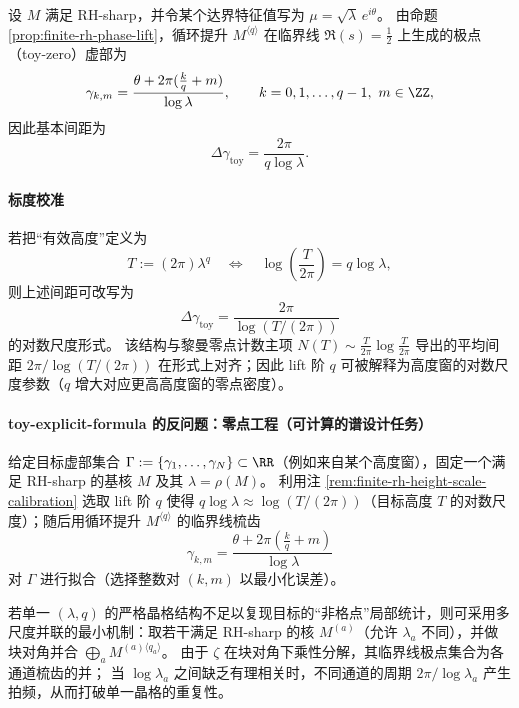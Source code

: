 \begin{remark}[高度--尺度校准：用 \texorpdfstring{$T=(2\pi)\lambda^q$}{T=(2pi)lambda^q} 对齐临界线梳齿密度]\label{rem:finite-rh-height-scale-calibration}
设 \(M\) 满足 RH-sharp，并令某个达界特征值写为 \(\mu=\sqrt{\lambda}\,e^{i\theta}\)。
由命题 \ref{prop:finite-rh-phase-lift}，循环提升 \(M^{\langle q\rangle}\) 在临界线 \(\Re(s)=\tfrac12\) 上生成的极点（toy-zero）虚部为
\[
\gamma_{k,m}=\frac{\theta+2\pi(\frac{k}{q}+m)}{\log\lambda},
\qquad k=0,1,\dots,q-1,\ m\in\ZZ,
\]
因此基本间距为
\[
\Delta\gamma_{\mathrm{toy}}=\frac{2\pi}{q\log\lambda}.
\]
\paragraph{标度校准}
若把“有效高度”定义为
\[
T:=(2\pi)\lambda^q
\quad\Longleftrightarrow\quad
\log\!\left(\frac{T}{2\pi}\right)=q\log\lambda,
\]
则上述间距可改写为
\[
\boxed{\ \Delta\gamma_{\mathrm{toy}}=\frac{2\pi}{\log(T/(2\pi))}\ }
\]
的对数尺度形式。
该结构与黎曼零点计数主项 \(N(T)\sim \frac{T}{2\pi}\log\frac{T}{2\pi}\) 导出的平均间距 \(2\pi/\log(T/(2\pi))\) 在形式上对齐；因此 lift 阶 \(q\) 可被解释为高度窗的对数尺度参数（\(q\) 增大对应更高高度窗的零点密度）。
\end{remark}

\paragraph{toy-explicit-formula 的反问题：零点工程（可计算的谱设计任务）}
给定目标虚部集合 \(\Gamma:=\{\gamma_1,\dots,\gamma_N\}\subset\RR\)（例如来自某个高度窗），固定一个满足 RH-sharp 的基核 \(M\) 及其 \(\lambda=\rho(M)\)。
利用注 \ref{rem:finite-rh-height-scale-calibration} 选取 lift 阶 \(q\) 使得 \(q\log\lambda\approx \log(T/(2\pi))\)（目标高度 \(T\) 的对数尺度）；随后用循环提升 \(M^{\langle q\rangle}\) 的临界线梳齿
\[
\gamma_{k,m}=\frac{\theta+2\pi(\frac{k}{q}+m)}{\log\lambda}
\]
对 \(\Gamma\) 进行拟合（选择整数对 \((k,m)\) 以最小化误差）。
\par
若单一 \((\lambda,q)\) 的严格晶格结构不足以复现目标的“非格点”局部统计，则可采用多尺度并联的最小机制：取若干满足 RH-sharp 的核 \(M^{(a)}\)（允许 \(\lambda_a\) 不同），并做块对角并合
\(
\bigoplus_a M^{(a)\langle q_a\rangle}
\)。
由于 \(\zeta\) 在块对角下乘性分解，其临界线极点集合为各通道梳齿的并；
当 \(\log\lambda_a\) 之间缺乏有理相关时，不同通道的周期 \(2\pi/\log\lambda_a\) 产生拍频，从而打破单一晶格的重复性。

